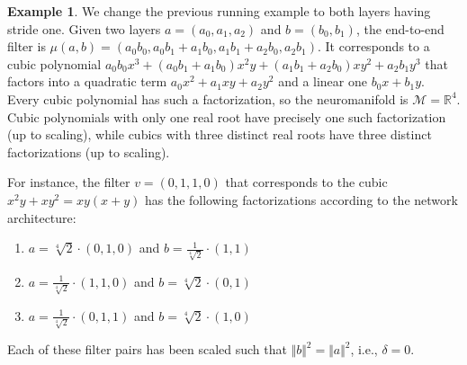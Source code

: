 \documentclass[twoside]{article}
\theoremstyle{definition}
\newtheorem{example}[theorem]{Example}
\theoremstyle{remark}
\begin{document}
\begin{example}\label{ex:somestridesequaltoone}
We change the previous running example to both layers having stride  one.
Given two layers $a=(a_0,a_1,a_2)$ and $b=(b_0,b_1)$, the end-to-end filter is
$\mu(a,b) = (a_0b_0, a_0b_1+a_1b_0, a_1b_1+a_2b_0, a_2b_1)$.
It corresponds to a cubic polynomial 
$a_0b_0x^3 + (a_0b_1+a_1b_0)x^2y + (a_1b_1+a_2b_0)xy^2 + a_2b_1y^3$ 
that factors into a quadratic term $a_0 x^2 + a_1 xy + a_2 y^2$ and a linear one $b_0 x + b_1 y$.
Every cubic polynomial has such a factorization, so the neuromanifold is $\mathcal{M} = \mathbb{R}^4$.
Cubic polynomials with only one real root have precisely one such factorization (up to scaling), while cubics with three distinct real roots have three distinct factorizations (up to scaling).

For instance, the filter $v = (0,1,1,0)$ that corresponds to the cubic $x^2y + xy^2 = xy(x+y)$ has the following factorizations according to the network architecture:
\begin{enumerate}
    \item  $a = \sqrt[4]{2} \cdot (0,1,0)$ and $b= \frac{1}{\sqrt[4]{2}} \cdot (1,1)$
    \item $a = \frac{1}{\sqrt[4]{2}} \cdot(1,1,0)$ and $b=\sqrt[4]{2} \cdot(0,1)$
    \item $a = \frac{1}{\sqrt[4]{2}} \cdot(0,1,1)$ and $b = \sqrt[4]{2} \cdot(1,0)$
\end{enumerate}
Each of these filter pairs has been scaled such that $\Vert b \Vert^2 = \Vert a \Vert^2$, i.e., $\delta = 0$.


\end{example}
\end{document}
